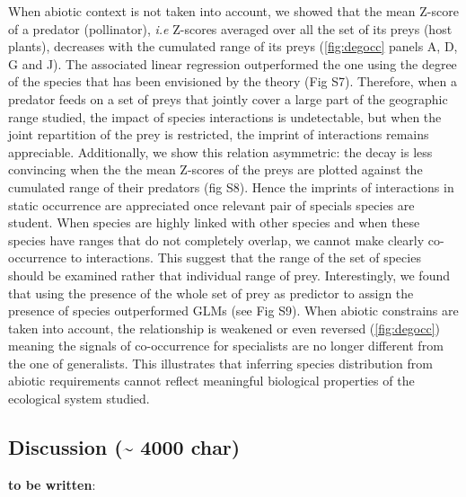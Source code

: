When abiotic context is not taken into account, we showed that the mean
Z-score of a predator (pollinator), \emph{i.e} Z-scores averaged over
all the set of its preys (host plants), decreases with the cumulated
range of its preys (\ref{fig:degocc} panels A, D, G and J). The
associated linear regression outperformed the one using the degree of
the species that has been envisioned by the theory (Fig S7). Therefore,
when a predator feeds on a set of preys that jointly cover a large part
of the geographic range studied, the impact of species interactions is
undetectable, but when the joint repartition of the prey is restricted,
the imprint of interactions remains appreciable. Additionally, we show
this relation asymmetric: the decay is less convincing when the the mean
Z-scores of the preys are plotted against the cumulated range of their
predators (fig S8). Hence the imprints of interactions in static
occurrence are appreciated once relevant pair of specials species are
student. When species are highly linked with other species and when
these species have ranges that do not completely overlap, we cannot make
clearly co-occurrence to interactions. This suggest that the range of
the set of species should be examined rather that individual range of
prey. Interestingly, we found that using the presence of the whole set
of prey as predictor to assign the presence of species outperformed GLMs
(see Fig S9). When abiotic constrains are taken into account, the
relationship is weakened or even reversed (\ref{fig:degocc}) meaning the
signals of co-occurrence for specialists are no longer different from
the one of generalists. This illustrates that inferring species
distribution from abiotic requirements cannot reflect meaningful
biological properties of the ecological system studied.

\subsection{Discussion (\textasciitilde{} 4000
char)}\label{discussion-4000-char}

\textbf{to be written}:


